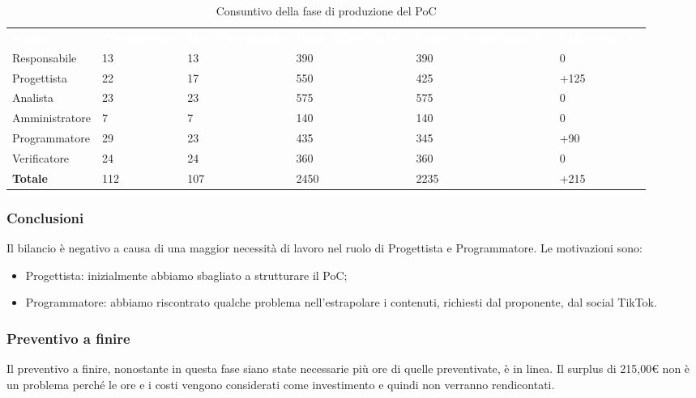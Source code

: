 \begin{table}[!htbp]
\begin{center}
\renewcommand{\arraystretch}{1.5}
\begin{tabular}{ m{}<{\centering}  m{}<{\centering} m{}<{\centering} m{}<{\centering} m{}<{\centering} m{}<{\centering}}
	\rowcolor{darkblue}
	\textcolor{white}{\textbf{Ruolo}} & \textcolor{white}{\textbf{Ore Effettive}} & \textcolor{white}{\textbf{Ore Preventivate}}&\textcolor{white}{\textbf{Costo Effettivo (\euro) }}&\textcolor{white}{\textbf{Costo Preventivato (\euro)}}&\textcolor{white}{\textbf{Differenza (\euro)}}\\ 
	Responsabile  & 13 & 13 & 390 & 390 & 0\\	
	
	Progettista & 22 & 17 & 550 & 425 & +125\\
	
	Analista & 23 & 23 & 575 & 575 & 0\\
	
	Amministratore & 7 & 7 & 140 & 140 & 0\\
	
	Programmatore & 29 & 23 & 435 & 345 &  +90\\
	
	Verificatore & 24 & 24 & 360 & 360 & 0\\
	
	\textbf{Totale} & 112 & 107 & 2450 & 2235 & +215\\
	
\end{tabular}
\caption{Consuntivo della fase di produzione del PoC}
\end{center}
\end{table}

\subsubsection{Conclusioni}
Il bilancio è negativo a causa di una maggior necessità di lavoro nel ruolo di Progettista e Programmatore.  Le motivazioni sono:
\begin{itemize}
\item Progettista: inizialmente abbiamo sbagliato a strutturare il PoC;
\item Programmatore: abbiamo riscontrato qualche problema nell'estrapolare i contenuti,  richiesti dal proponente,  dal social TikTok.
\end{itemize}

\subsubsection{Preventivo a finire}
Il preventivo a finire,  nonostante in questa fase siano state necessarie più ore di quelle preventivate,  è in linea.  Il surplus di 215,00\euro \xspace non è un problema perché le ore e i costi vengono considerati come investimento e quindi non verranno rendicontati.